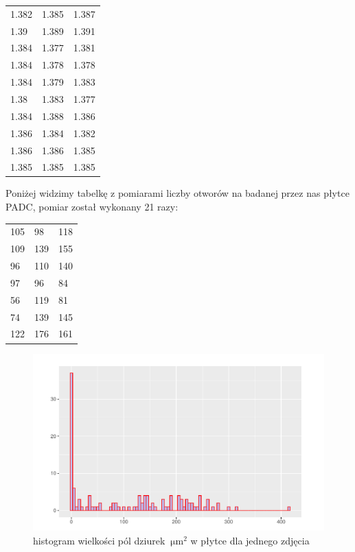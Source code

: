 \documentclass{article}
\begin{document}
\begin{table}[h!]
\centering
\begin{tabular}{|l|l|l|}
\hline
1.382	& 1.385	& 1.387 \\
1.39	& 1.389	& 1.391 \\
1.384	& 1.377	& 1.381 \\
1.384	& 1.378	& 1.378 \\
1.384	& 1.379	& 1.383 \\
1.38	& 1.383	& 1.377 \\
1.384	& 1.388	& 1.386 \\
1.386	& 1.384	& 1.382 \\
1.386	& 1.386	& 1.385 \\
1.385	& 1.385	& 1.385 \\
\hline
\end{tabular}
\end{table}

\clearpage


Poniżej widzimy tabelkę z pomiarami liczby otworów na badanej przez nas płytce PADC, pomiar został wykonany 21 razy:

\begin{table}[h!]
\centering
\begin{tabular}{|l|l|l|}
\hline
105	& 98	& 118 \\
109	& 139	& 155 \\
96	& 110	& 140 \\
97	& 96	& 84 \\
56	& 119	& 81 \\
74	& 139	& 145 \\
122	& 176	& 161 \\
\hline
\end{tabular}
\end{table}

\begin{figure}[h!]
\centerline{\includegraphics[scale=1]{Fizyka4}}
\caption{histogram wielkości pól dziurek $\SI{}{\micro\metre}^2$ w płytce dla jednego zdjęcia}
\end{figure}
\end{document}
